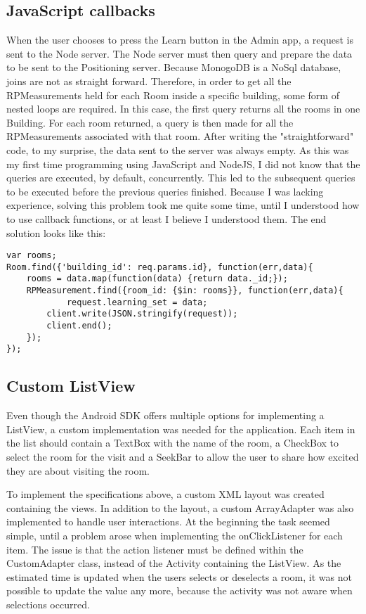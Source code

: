 \subsection{JavaScript callbacks} 
When the user chooses to press the Learn button in the Admin app, a request is sent to the Node server. The Node server must then query and prepare the data to be sent to the Positioning server. Because MonogoDB is a NoSql database, joins are not as straight forward. Therefore, in order to get all the RPMeasurements held for each Room inside a specific building, some form of nested loops are required. In this case, the first query returns all the rooms in one Building. For each room returned, a query is then made for all the RPMeasurements associated with that room. After writing the "straightforward" code, to my surprise, the data sent to the server was always empty. As this was my first time programming using JavaScript and NodeJS, I did not know that the queries are executed, by default, concurrently. This led to the subsequent queries to be executed before the previous queries finished. Because I was lacking experience, solving this problem took me quite some time, until I understood how to use callback functions, or at least I believe I understood them. The end solution looks like this:
\begin{lstlisting}
var rooms;
Room.find({'building_id': req.params.id}, function(err,data){
	rooms = data.map(function(data) {return data._id;});
    RPMeasurement.find({room_id: {$in: rooms}}, function(err,data){
    		request.learning_set = data;
        client.write(JSON.stringify(request));
        client.end();
    });
});
\end{lstlisting}

\subsection{Custom ListView}
Even though the Android SDK offers multiple options for implementing a ListView, a custom implementation was needed for the application. Each item in the list should contain a TextBox with the name of the room, a CheckBox to select the room for the visit and a SeekBar to allow the user to share how excited they are about visiting the room. 

To implement the specifications above, a custom XML layout was created containing the views. In addition to the layout, a custom ArrayAdapter was also implemented to handle user interactions. At the beginning the task seemed simple, until a problem arose when implementing the onClickListener for each item. The issue is that the action listener must be defined within the CustomAdapter class, instead of the Activity containing the ListView. As the estimated time is updated when the users selects or deselects a room, it was not possible to update the value any more, because the activity was not aware when selections occurred. 

